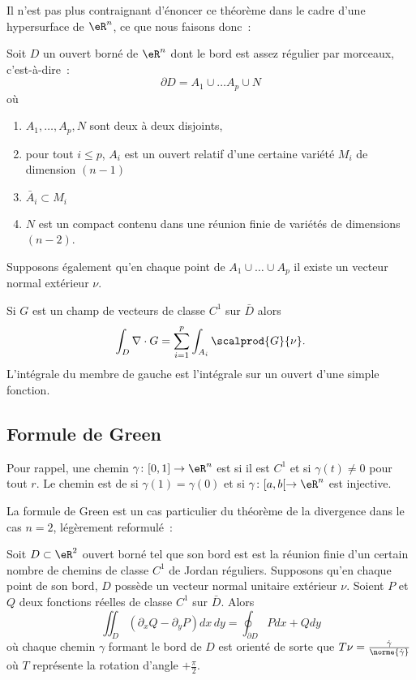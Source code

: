 Il n'est pas plus contraignant d'énoncer ce théorème dans le cadre d'une hypersurface de $\eR^n$, ce que nous faisons donc~:
\begin{theorem}
	Soit $D$ un ouvert borné de $\eR^n$ dont le bord est \og assez régulier par morceaux\fg{}, c'est-à-dire~:
	\begin{equation}
		\partial D = A_1 \cup \ldots A_p \cup N
	\end{equation} 
	où
	\begin{enumerate}
		\item $A_1, \ldots, A_p, N$ sont deux à deux disjoints,
		\item pour tout $i \leq p$, $A_i$ est un ouvert relatif d'une certaine variété $M_i$ de dimension $(n-1)$
		\item $\bar A_i \subset M_i$
		\item $N$ est un compact contenu dans une réunion finie de variétés de dimensions $(n-2)$.
	\end{enumerate}
	Supposons également qu'en chaque point de $A_1 \cup \ldots \cup A_p$ il existe un vecteur normal extérieur $\nu$.
	
	Si $G$ est un champ de vecteurs de classe $C^1$ sur $\bar D$ alors
	\begin{equation}
		\int_D \nabla\cdot G = \sum_{i=1}^p \int_{A_i} \scalprod{G}{\nu}.
	\end{equation}
	L'intégrale du membre de gauche est l'intégrale sur un ouvert d'une simple fonction.
\end{theorem}

\subsection{Formule de Green}

Pour rappel, une chemin $\gamma\colon \mathopen[ 0 , 1 \mathclose]\to \eR^n$ est  si il est $C^1$ et si $\gamma(t)\neq 0$ pour tout $r$. Le chemin est de  si $\gamma(1)=\gamma(0)$ et si $\gamma\colon \mathopen[ a , b [\to \eR^n$ est injective.

La formule de Green est un cas particulier du théorème de la divergence dans
le cas $n = 2$, légèrement reformulé~:
\begin{theorem}
	Soit $D \subset \eR^2$ ouvert borné tel que son bord est est la réunion finie d'un certain nombre de chemins de classe $C^1$ de Jordan réguliers.  Supposons qu'en chaque point de son bord, $D$ possède un vecteur normal unitaire extérieur $\nu$. Soient $P$ et $Q$ deux fonctions réelles de classe $C^1$ sur $\bar D$. Alors
    \begin{equation}  \label{EqYLblSqV}
    \iint_D (\partial_xQ - \partial_yP)dx\,dy = \oint_{\partial D}
    Pd x + Q d y
  \end{equation}
  où chaque chemin $\gamma$ formant le bord de $D$ est orienté de
  sorte que $T \nu = \frac{\dot\gamma}{\norme{\dot\gamma}}$ où $T$
  représente la rotation d'angle $+\frac\pi2$.
\end{theorem}

